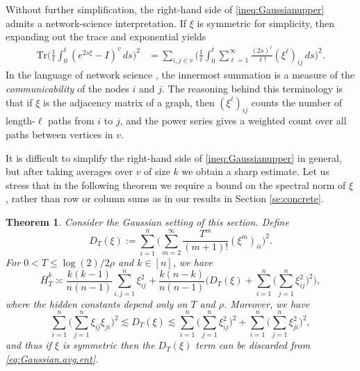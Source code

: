 \documentclass[11pt,reqno]{amsart}
\numberwithin{equation}{section}
\newtheorem{theorem}{Theorem}[section]
\theoremstyle{definition}
\def\tr{{\mathrm{Tr}}}
\begin{document}
Without further simplification, the right-hand side of \eqref{ineq:Gaussianupper} admits a network-science interpretation. If $\xi$ is symmetric for simplicity, then expanding out the trace and exponential yields
\begin{align*}
\tr\bigg( \frac{1}{t} \int_0^t (e^{2s\xi} - I)^v\,ds \bigg)^2 
	&= \sum_{i,j \in v}\bigg( \frac{1}{t} \int_0^t \sum_{\ell=1}^\infty \frac{(2s)^\ell}{\ell!} (\xi^\ell)_{ij} \,ds \bigg)^2.
\end{align*}
In the language of network science \cite{estrada2008communicability}, the innermost summation is a measure of the \emph{communicability} of the nodes $i$ and $j$. The reasoning behind this terminology is that if $\xi$ is the adjacency matrix of a graph, then $(\xi^\ell)_{ij}$ counts the number of length-$\ell$ paths from $i$ to $j$, and the power series gives a weighted count over all paths between vertices in $v$. 

It is difficult to simplify the right-hand side of \eqref{ineq:Gaussianupper} in general, but after taking averages over $v$ of size $k$ we obtain a sharp estimate.
Let us stress that in the following theorem we require a bound on the spectral norm of $\xi$, rather than  row or column sums as in our results in Section \ref{se:concrete}.


\begin{theorem} 	\label{theorem:Gaussian.avg.entropy}
	Consider the Gaussian setting of this section. Define
	\begin{equation} \label{eq:quantity.for.Gaussian}
	D_T(\xi) := \sum_{i=1}^n \bigg(\sum_{m=2}^\infty \frac{T^m}{(m+1)!} (\xi^m)_{ii}\bigg)^2.
\end{equation}
For $0 < T \le \log(2) /2 \rho$ and $k \in [n]$, we have
	\begin{equation} \label{eq:Gaussian.avg.ent}
		\overline{H}^{k}_{T} \asymp  \frac{k(k-1)}{n(n-1)}\sum_{i,j=1}^n  \xi_{ij}^2 +  \frac{k (n - k)}{n (n - 1)}\bigg(D_T(\xi) + \sum_{i=1}^n \bigg(\sum_{j=1}^n  \xi_{ij}^2 \bigg)^2   \bigg),
\end{equation}
where the hidden  constants depend only on  $T$ and $\rho$. Moreover, we have
\begin{equation} \label{eq:quantity.for.Gaussian.bounded}
		\sum_{i=1}^n \bigg(\sum_{j=1}^n \xi_{ij}\xi_{ji} \bigg)^2 \lesssim
		D_T(\xi)
		\lesssim \sum_{i=1}^n \bigg(\sum_{j=1}^n \xi_{ij}^2 \bigg)^2 + \sum_{i=1}^n \bigg(\sum_{j=1}^n \xi_{ji}^2 \bigg)^2,
	\end{equation}
	and thus if $\xi$ is symmetric then the $D_T(\xi)$ term can be discarded from \eqref{eq:Gaussian.avg.ent}.
\end{theorem}
\end{document}
